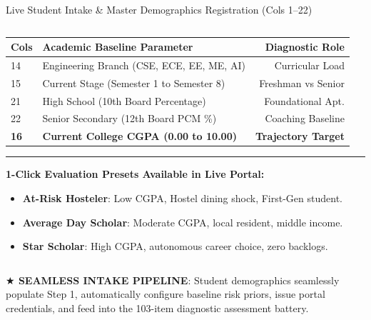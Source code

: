 \documentclass{beamer}
\begin{document}
\begin{frame}[t]{Live Student Intake \& Master Demographics Registration (Cols 1--22)}
\begin{columns}[T]
    \begin{column}{0.49\textwidth}
      \begin{tcolorbox}[colback=white, colframe=BluePrimary, arc=1.2mm, boxrule=0.8pt, top=0.5mm, bottom=0.5mm, left=0.8mm, right=0.8mm, title={\scriptsize\bfseries\color{white}Prior Academic Foundation \& College Progress (Cols 14--16, 21--22)}, colbacktitle=BluePrimary]
        \fontsize{4.6pt}{5.6pt}\selectfont
        \renewcommand{\arraystretch}{0.65}
        \begin{tabularx}{\linewidth}{@{}l X r@{}}
          \toprule
          \textbf{Cols} & \textbf{Academic Baseline Parameter} & \textbf{Diagnostic Role} \\
          \midrule
          \rowcolor{BlueLight} 14 & Engineering Branch (CSE, ECE, EE, ME, AI) & Curricular Load \\
          \rowcolor{BlueLight} 15 & Current Stage (Semester 1 to Semester 8) & Freshman vs Senior \\
          \rowcolor{BlueLight} 21 & High School (10th Board Percentage) & Foundational Apt. \\
          \rowcolor{BlueLight} 22 & Senior Secondary (12th Board PCM \%) & Coaching Baseline \\
          \rowcolor{GoldBG} \textbf{16} & \textbf{Current College CGPA (0.00 to 10.00)} & \textbf{Trajectory Target} \\
          \bottomrule
        \end{tabularx}
        \vspace{1mm}
        \hrule
        \vspace{1mm}
        \fontsize{4.5pt}{5.5pt}\selectfont
        \textbf{1-Click Evaluation Presets Available in Live Portal:}
        \begin{itemize}\setlength{\itemsep}{1pt}
          \item \textbf{At-Risk Hosteler}: Low CGPA, Hostel dining shock, First-Gen student.
          \item \textbf{Average Day Scholar}: Moderate CGPA, local resident, middle income.
          \item \textbf{Star Scholar}: High CGPA, autonomous career choice, zero backlogs.
        \end{itemize}
      \end{tcolorbox}
    \end{column}
  \end{columns}
  \vspace{0.8mm}

  \begin{takeawaybanner}
    \fontsize{4.8pt}{5.8pt}\selectfont
    \textbf{\color{GoldPill}$\bigstar$ SEAMLESS INTAKE PIPELINE}: Student demographics seamlessly populate Step 1, automatically configure baseline risk priors, issue portal credentials, and feed into the 103-item diagnostic assessment battery.
  \end{takeawaybanner}
\end{frame}
\end{document}
